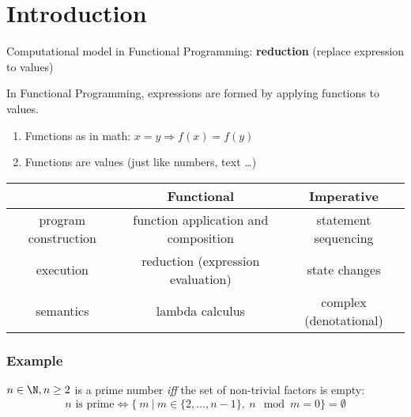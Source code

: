 


\chapter{Introduction} %
\label{cha:introduction}

Computational model in Functional Programming: \textbf{reduction} (replace expression to values)

In Functional Programming, expressions are formed by applying functions to values.

\begin{enumerate}
    \item Functions as in math: $x = y \Rightarrow f(x) = f(y)$
    \item Functions are values (just like numbers, text \dots)
\end{enumerate}

\vspace{9pt}\begin{center}\begin{tabular}{|c|c|c|}\hline
\rowcolor{grau}                         & Functional                                & Imperative        \\\hline
                program construction    & function application and composition      & statement sequencing      \\\hline
                execution               & reduction (expression evaluation)         & state changes             \\\hline
                semantics               & lambda calculus                           & complex (denotational)    \\\hline
\end{tabular}\end{center}\vspace{9pt}

\newpage

\subsection*{Example}
$n \in \N, n \ge 2 $ is a prime number \textit{iff} the set of non-trivial factors is empty:\\
$$ n \text{ is prime} \Leftrightarrow \{\ m\ |\ m \in \{2,\dots, n-1\},\ n \mod m = 0 \} = \emptyset $$
\\



